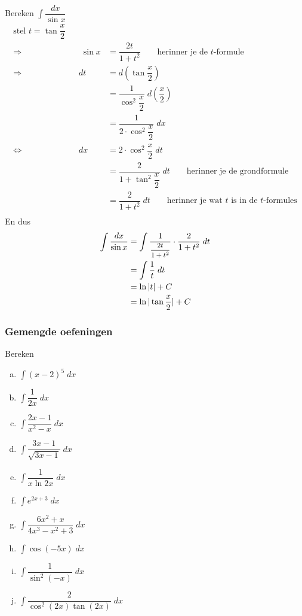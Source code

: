 \documentclass[a4paper,12pt, twoside]{article}
\begin{document}
Bereken $\displaystyle\int \dfrac{dx}{\sin x}$
\begin{alignat*}{2}
  \mbox{stel } t =\tan \dfrac{x}{2}\\
  \Rightarrow &&\;\sin x &= \dfrac{2t}{1+t^2} \qquad \mbox{herinner je de $t$-formule}\\
  \Rightarrow &&dt &= d\left(\tan\dfrac{x}{2}\right)\\
  && &=\dfrac{1}{\cos^2\dfrac{x}{2}} \; d\left(\dfrac{x}{2}\right)\\
  && &=\dfrac{1}{2 \cdot \cos^2\dfrac{x}{2}} \; dx\\
  \Leftrightarrow &&dx &= 2 \cdot \cos^2\dfrac{x}{2} \; dt\\
  && &= \dfrac{2}{1+\tan^2\dfrac{x}{2}} \; dt \qquad \mbox{herinner je de grondformule}\\
  && &= \dfrac{2}{1+t^2} \; dt \qquad \mbox{herinner je wat $t$ is in de $t$-formules}\\
\end{alignat*}
En dus
\begin{align*}
  \int \dfrac{dx}{\sin x}
  &= \int \dfrac{1}{\text{\footnotesize$\dfrac{2t}{1+t^2}$}} \cdot \dfrac{2}{1+t^2} \;dt\\
  &= \int \dfrac{1}{t}\;dt\\
  &= \ln|t| + C\\
  &= \ln|\tan\dfrac{x}{2}| + C\\
\end{align*}

\subsubsection{Gemengde oefeningen}

\begin{oefening}
  Bereken
  \begin{multicols}{2}
  \begin{enumerate}[(a)]
  \item $\displaystyle\int (x-2)^5 \;dx$
  \item $\displaystyle\int \dfrac{1}{2x} \;dx$
  \item $\displaystyle\int \dfrac{2x-1}{x^2-x}  \;dx$
  \item $\displaystyle\int \dfrac{3x-1}{\sqrt{3x-1}}  \;dx$
  \item $\displaystyle\int \dfrac{1}{x \ln 2x}  \;dx$
  \item $\displaystyle\int e^{2x+3} \;dx$
  \item $\displaystyle\int \dfrac{6x^2+x}{4x^3-x^2+3} \;dx$
  \item $\displaystyle\int \cos (-5x) \;dx$
  \item $\displaystyle\int \dfrac{1}{\sin^2(-x)} \;dx$
  \item $\displaystyle\int \dfrac{2}{\cos^2(2x)\tan(2x)} \;dx$
  \end{enumerate}
\end{multicols}
\end{oefening}
\end{document}
